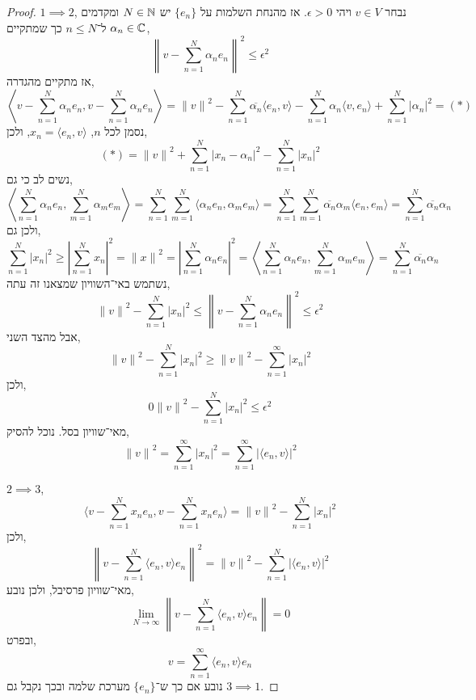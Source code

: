 \begin{proof}
	$1 \implies 2$,
	נבחר $v \in V$ ויהי $\epsilon > 0$.
	אז מהנחת השלמות על $\{ e_n \}$ יש $N \in \mathbb{N}$ ומקדמים $\alpha_n \in \mathbb{C}$ ל־$n \le N$ כך שמתקיים,
	\[
		{\left\lVert v - \sum_{n = 1}^N \alpha_n e_n \right\rVert}^2
		\le \epsilon^2
	\]
	אז מתקיים מהגדרה,
	\[
		\left\langle v - \sum_{n = 1}^N \alpha_n e_n, v - \sum_{n = 1}^N \alpha_n e_n \right\rangle	
		= {\lVert v \rVert}^2 - \sum_{n = 1}^N \overline{\alpha_n} \langle e_n, v \rangle - \sum_{n = 1}^N \alpha_n \langle v, e_n \rangle + \sum_{n = 1}^N {| \alpha_n |}^2
		= (*)
	\]
	נסמן לכל $n$, $x_n = \langle e_n, v \rangle$, ולכן,
	\[
		(*)
		= {\lVert v \rVert}^2 + \sum_{n = 1}^N {| x_n - \alpha_n |}^2 - \sum_{n = 1}^N {| x_n |}^2
	\]
	נשים לב כי גם,
	\[
		\left\langle \sum_{n = 1}^N \alpha_n e_n, \sum_{m = 1}^N \alpha_m e_m \right\rangle
		= \sum_{n = 1}^N \sum_{m = 1}^N \langle \alpha_n e_n, \alpha_m e_m \rangle
		= \sum_{n = 1}^N \sum_{m = 1}^N \overline{\alpha_n} \alpha_m \langle e_n, e_m \rangle
		= \sum_{n = 1}^N \overline{\alpha_n} \alpha_n
	\]
	ולכן גם,
	\[
		\sum_{n = 1}^N {| x_n |}^2
		\ge {\left\lvert \sum_{n = 1}^N x_n \right\rvert}^2
		= {\lVert x \rVert}^2
		= {\left\lvert \sum_{n = 1}^N \alpha_n e_n \right\rvert}^2
		= \left\langle \sum_{n = 1}^N \alpha_n e_n, \sum_{m = 1}^N \alpha_m e_m \right\rangle
		= \sum_{n = 1}^N \overline{\alpha_n} \alpha_n
	\]
	נשתמש באי־השוויון שמצאנו זה עתה,
	\[
		{\lVert v \rVert}^2 - \sum_{n = 1}^N {| x_n |}^2
		\le {\left\lVert v - \sum_{n = 1}^N \alpha_n e_n \right\rVert}^2
		\le \epsilon^2
	\]
	אבל מהצד השני,
	\[
		{\lVert v \rVert}^2 - \sum_{n = 1}^N {| x_n |}^2
		\ge {\lVert v \rVert}^2 - \sum_{n = 1}^\infty {| x_n |}^2
	\]
	ולכן,
	\[
		0
		{\lVert v \rVert}^2 - \sum_{n = 1}^N {| x_n |}^2
		\le \epsilon^2
	\]
	מאי־שוויון בסל.
	נוכל להסיק,
	\[
		{\lVert v \rVert}^2 = \sum_{n = 1}^\infty {| x_n |}^2
		= \sum_{n = 1}^\infty {|\langle e_n, v \rangle|}^2
	\]

	$2 \implies 3$,
	\[
		\langle v - \sum_{n = 1}^N x_n e_n, v - \sum_{n = 1}^N x_n e_n \rangle
		= {\lVert v \rVert}^2 - \sum_{n = 1}^N {| x_n |}^2
	\]
	ולכן,
	\[
		{\left\lVert v - \sum_{n = 1}^N \langle e_n, v \rangle e_n \right\rVert}^2
		= {\lVert v \rVert}^2 - \sum_{n = 1}^N {| \langle e_n, v \rangle |}^2
	\]
	מאי־שוויון פרסיבל, ולכן נובע,
	\[
		\lim_{N \to \infty} \left\lVert v - \sum_{n = 1}^N \langle e_n, v \rangle e_n \right\rVert
		= 0
	\]
	ובפרט,
	\[
		v = \sum_{n = 1}^\infty \langle e_n, v \rangle e_n
	\]
	נובע אם כך ש־$\{ e_n \}$ מערכת שלמה ובכך נקבל גם $3 \implies 1$.
\end{proof}
